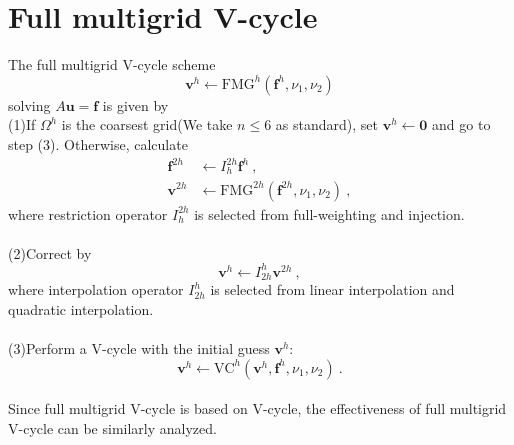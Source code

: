 \documentclass[a4paper,twocolumn]{article}
\theoremstyle{definition}
\begin{document}
\section{Full multigrid V-cycle}
\balance
The full multigrid V-cycle scheme
$$
\mathbf{v}^h \gets \mathrm{FMG}^h(\mathbf{f}^h,\nu_1,\nu_2) 
$$
solving $A\textbf{u} = \textbf{f}$ is given by\\
(1)If $\Omega^h$ is the coarsest grid(We take $n \le 6$ as standard), set $\mathbf{v}^h \gets \mathbf{0}$ and go to step (3).
Otherwise, calculate 
$$
\begin{aligned}
\mathbf{f}^{2h} &\gets I_h^{2h} \mathbf{f}^h \ , \\
\mathbf{v}^{2h} &\gets \mathrm{FMG}^{2h}(\mathbf{f}^{2h},\nu_1,\nu_2) \ ,
\end{aligned}
$$
where restriction operator $I_h^{2h}$ is selected from full-weighting and injection.\\\\
(2)Correct by
$$
\mathbf{v}^{h} \gets I_{2h}^{h} \mathbf{v}^{2h} \ , 
$$
where interpolation operator $I_{2h}^{h}$ is selected from linear interpolation and quadratic interpolation.\\\\
(3)Perform a V-cycle with the initial guess $\mathbf{v}^{h}$:
$$
\mathbf{v}^h \gets \mathrm{VC}^h(\mathbf{v}^h,\mathbf{f}^h,\nu_1,\nu_2)  \ .
$$
\\
Since full multigrid V-cycle is based on V-cycle, the effectiveness of full multigrid V-cycle can be similarly analyzed.
\end{document}

